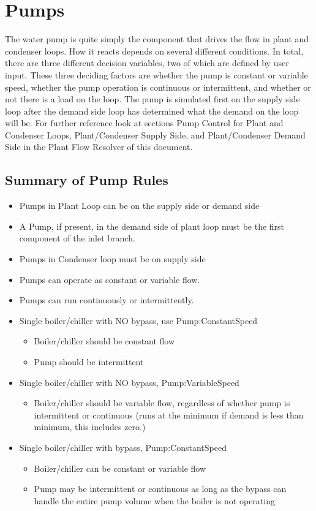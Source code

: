 \section{Pumps }\label{pumps}

The water pump is quite simply the component that drives the flow in plant and condenser loops. How it reacts depends on several different conditions. In total, there are three different decision variables, two of which are defined by user input. These three deciding factors are whether the pump is constant or variable speed, whether the pump operation is continuous or intermittent, and whether or not there is a load on the loop. The pump is simulated first on the supply side loop after the demand side loop has determined what the demand on the loop will be. For further reference look at sections Pump Control for Plant and Condenser Loops, Plant/Condenser Supply Side, and Plant/Condenser Demand Side in the Plant Flow Resolver of this document.

\subsection{Summary of Pump Rules}\label{summary-of-pump-rules}

\begin{itemize}
\item
  Pumps in Plant Loop can be on the supply side or demand side
\item
  A Pump, if present, in the demand side of plant loop must be the first component of the inlet branch.
\item
  Pumps in Condenser loop must be on supply side
\item
  Pumps can operate as constant or variable flow.
\item
  Pumps can run continuously or intermittently.
\item
  Single boiler/chiller with NO bypass, use Pump:ConstantSpeed
  \begin{itemize}
\item
  Boiler/chiller should be constant flow
\item
  Pump should be intermittent
  \end{itemize}
\item
  Single boiler/chiller with NO bypass, Pump:VariableSpeed
  \begin{itemize}
\item
  Boiler/chiller should be variable flow, regardless of whether pump is intermittent or continuous (runs at the minimum if demand is less than minimum, this includes zero.)
  \end{itemize}
\item
  Single boiler/chiller with bypass, Pump:ConstantSpeed
  \begin{itemize}
\item
  Boiler/chiller can be constant or variable flow
\item
  Pump may be intermittent or continuous as long as the bypass can handle the entire pump volume when the boiler is not operating
  \end{itemize}
\end{itemize}


